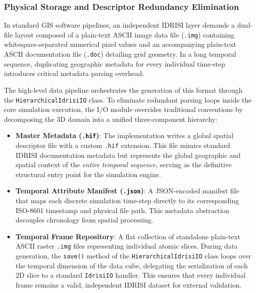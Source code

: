 \subsubsection{Physical Storage and Descriptor Redundancy Elimination}
\label{subsub:physical_storage_mechanics}

In standard GIS software pipelines, an independent IDRISI layer demands a dual-file layout composed of a plain-text ASCII image data file 
(\texttt{.img}) containing whitespace-separated numerical pixel values and an accompanying plain-text ASCII documentation file 
(\texttt{.doc}) detailing grid geometry. In a long temporal sequence, duplicating geographic metadata for every individual time-step 
introduces critical metadata parsing overhead. 

The high-level data pipeline orchestrates the generation of this format through the \texttt{HierarchicalIdrisiIO} class. To eliminate 
redundant parsing loops inside the core simulation execution, the I/O module overrides traditional conventions by decomposing the 3D domain 
into a unified three-component hierarchy:

\begin{itemize}
    \item \textbf{Master Metadata (\texttt{.hif})}: The implementation writes a global spatial descriptor file with a custom \texttt{.hif} 
    extension. This file mimics standard IDRISI documentation metadata but represents the global geographic and spatial context of the 
    \textsl{entire temporal sequence}, serving as the definitive structural entry point for the simulation engine.
    
    \item \textbf{Temporal Attribute Manifest (\texttt{.json})}: A JSON-encoded manifest file that maps each discrete simulation 
    time-step directly to its corresponding ISO-8601 timestamp and physical file path. This metadata abstraction decouples chronology from 
    spatial processing.
    
    \item \textbf{Temporal Frame Repository}: A flat collection of standalone plain-text ASCII raster \texttt{.img} files representing 
    individual atomic slices. During data generation, the \texttt{save()} method of the \texttt{HierarchicalIdrisiIO} class loops over the 
    temporal dimension of the data cube, delegating the serialization of each 2D slice to a standard \texttt{IdrisiIO} handler. This ensures 
    that every individual frame remains a valid, independent IDRISI dataset for external validation.
\end{itemize}

